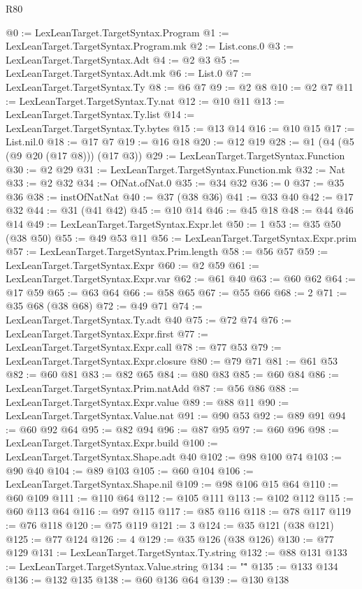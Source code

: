 \begin{lexlean}{R80}
\begin{coremodule}
@0 := LexLeanTarget.TargetSyntax.Program
@1 := LexLeanTarget.TargetSyntax.Program.mk
@2 := List.cons.{0}
@3 := LexLeanTarget.TargetSyntax.Adt
@4 := @2 @3
@5 := LexLeanTarget.TargetSyntax.Adt.mk
@6 := List.{0}
@7 := LexLeanTarget.TargetSyntax.Ty
@8 := @6 @7
@9 := @2 @8
@10 := @2 @7
@11 := LexLeanTarget.TargetSyntax.Ty.nat
@12 := @10 @11
@13 := LexLeanTarget.TargetSyntax.Ty.list
@14 := LexLeanTarget.TargetSyntax.Ty.bytes
@15 := @13 @14
@16 := @10 @15
@17 := List.nil.{0}
@18 := @17 @7
@19 := @16 @18
@20 := @12 @19
@28 := @1 (@4 (@5 (@9 @20 (@17 @8))) (@17 @3))
@29 := LexLeanTarget.TargetSyntax.Function
@30 := @2 @29
@31 := LexLeanTarget.TargetSyntax.Function.mk
@32 := Nat
@33 := @2 @32
@34 := OfNat.ofNat.{0}
@35 := @34 @32
@36 := 0
@37 := @35 @36
@38 := instOfNatNat
@40 := @37 (@38 @36)
@41 := @33 @40
@42 := @17 @32
@44 := @31 (@41 @42)
@45 := @10 @14
@46 := @45 @18
@48 := @44 @46 @14
@49 := LexLeanTarget.TargetSyntax.Expr.let
@50 := 1
@53 := @35 @50 (@38 @50)
@55 := @49 @53 @11
@56 := LexLeanTarget.TargetSyntax.Expr.prim
@57 := LexLeanTarget.TargetSyntax.Prim.length
@58 := @56 @57
@59 := LexLeanTarget.TargetSyntax.Expr
@60 := @2 @59
@61 := LexLeanTarget.TargetSyntax.Expr.var
@62 := @61 @40
@63 := @60 @62
@64 := @17 @59
@65 := @63 @64
@66 := @58 @65
@67 := @55 @66
@68 := 2
@71 := @35 @68 (@38 @68)
@72 := @49 @71
@74 := LexLeanTarget.TargetSyntax.Ty.adt @40
@75 := @72 @74
@76 := LexLeanTarget.TargetSyntax.Expr.first
@77 := LexLeanTarget.TargetSyntax.Expr.call
@78 := @77 @53
@79 := LexLeanTarget.TargetSyntax.Expr.closure
@80 := @79 @71
@81 := @61 @53
@82 := @60 @81
@83 := @82 @65
@84 := @80 @83
@85 := @60 @84
@86 := LexLeanTarget.TargetSyntax.Prim.natAdd
@87 := @56 @86
@88 := LexLeanTarget.TargetSyntax.Expr.value
@89 := @88 @11
@90 := LexLeanTarget.TargetSyntax.Value.nat
@91 := @90 @53
@92 := @89 @91
@94 := @60 @92 @64
@95 := @82 @94
@96 := @87 @95
@97 := @60 @96
@98 := LexLeanTarget.TargetSyntax.Expr.build
@100 := LexLeanTarget.TargetSyntax.Shape.adt @40
@102 := @98 @100 @74
@103 := @90 @40
@104 := @89 @103
@105 := @60 @104
@106 := LexLeanTarget.TargetSyntax.Shape.nil
@109 := @98 @106 @15 @64
@110 := @60 @109
@111 := @110 @64
@112 := @105 @111
@113 := @102 @112
@115 := @60 @113 @64
@116 := @97 @115
@117 := @85 @116
@118 := @78 @117
@119 := @76 @118
@120 := @75 @119
@121 := 3
@124 := @35 @121 (@38 @121)
@125 := @77 @124
@126 := 4
@129 := @35 @126 (@38 @126)
@130 := @77 @129
@131 := LexLeanTarget.TargetSyntax.Ty.string
@132 := @88 @131
@133 := LexLeanTarget.TargetSyntax.Value.string
@134 := "\""
@135 := @133 @134
@136 := @132 @135
@138 := @60 @136 @64
@139 := @130 @138

\end{coremodule}
\end{lexlean}
